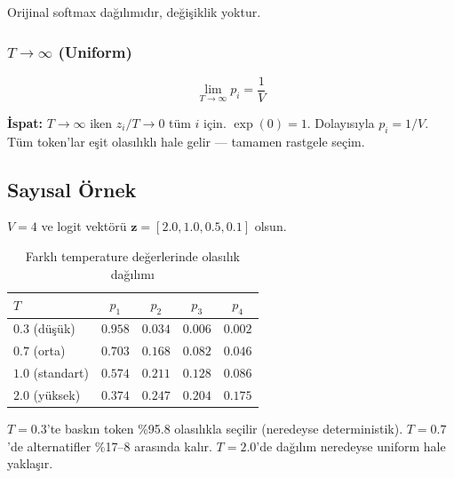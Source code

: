 Orijinal softmax da\u{g}{\i}l{\i}m{\i}d{\i}r, de\u{g}i\c{s}iklik yoktur.

\subsubsection{$T \to \infty$ (Uniform)}

\begin{equation}
\lim_{T \to \infty} p_i = \frac{1}{V}
\label{eq:temp-inf}
\end{equation}

\textbf{\.{I}spat:} $T \to \infty$ iken $z_i/T \to 0$ t\"{u}m $i$ i\c{c}in. $\exp(0) = 1$. Dolay{\i}s{\i}yla $p_i = 1/V$. T\"{u}m token'lar e\c{s}it olas{\i}l{\i}kl{\i} hale gelir --- tamamen rastgele se\c{c}im.


\subsection{Say{\i}sal \"{O}rnek}
\label{sec:softmax-numerical}

$V = 4$ ve logit vekt\"{o}r\"{u} $\mathbf{z} = [2.0, 1.0, 0.5, 0.1]$ olsun.

\begin{table}[H]
\centering
\caption{Farkl{\i} temperature de\u{g}erlerinde olas{\i}l{\i}k da\u{g}{\i}l{\i}m{\i}}
\label{tab:temp-comparison}
\begin{tabular}{lcccc}
\toprule
\color{chapterBlue}\textbf{$T$} &
\color{chapterBlue}$p_1$ &
\color{chapterBlue}$p_2$ &
\color{chapterBlue}$p_3$ &
\color{chapterBlue}$p_4$ \\
\midrule
$0.3$ (d\"{u}\c{s}\"{u}k) & $\mathbf{0.958}$ & $0.034$ & $0.006$ & $0.002$ \\
$0.7$ (orta) & $\mathbf{0.703}$ & $0.168$ & $0.082$ & $0.046$ \\
$1.0$ (standart) & $0.574$ & $0.211$ & $0.128$ & $0.086$ \\
$2.0$ (y\"{u}ksek) & $0.374$ & $0.247$ & $0.204$ & $0.175$ \\
\bottomrule
\end{tabular}
\end{table}

$T = 0.3$'te bask{\i}n token \%95.8 olas{\i}l{\i}kla se\c{c}ilir (neredeyse deterministik). $T = 0.7$'de alternatifler \%17--8 aras{\i}nda kal{\i}r. $T = 2.0$'de da\u{g}{\i}l{\i}m neredeyse uniform hale yakla\c{s}{\i}r.

